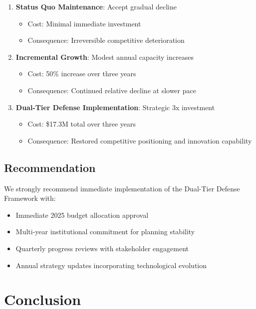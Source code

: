 \documentclass{article}
\begin{document}
\begin{enumerate}
\item \textbf{Status Quo Maintenance}: Accept gradual decline
   \begin{itemize}
   \item Cost: Minimal immediate investment
   \item Consequence: Irreversible competitive deterioration
   \end{itemize}

\item \textbf{Incremental Growth}: Modest annual capacity increases
   \begin{itemize}
   \item Cost: 50\% increase over three years
   \item Consequence: Continued relative decline at slower pace
   \end{itemize}

\item \textbf{Dual-Tier Defense Implementation}: Strategic 3x investment
   \begin{itemize}
   \item Cost: \$17.3M total over three years
   \item Consequence: Restored competitive positioning and innovation capability
   \end{itemize}
\end{enumerate}

\subsection{Recommendation}

We strongly recommend immediate implementation of the Dual-Tier Defense Framework with:

\begin{itemize}
\item Immediate 2025 budget allocation approval
\item Multi-year institutional commitment for planning stability
\item Quarterly progress reviews with stakeholder engagement
\item Annual strategy updates incorporating technological evolution
\end{itemize}

\section{Conclusion}
\end{document}
